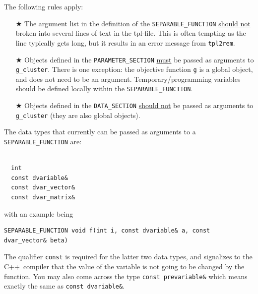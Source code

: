 \documentclass[12pt,letter,reqno]{book}
\begin{document}
The following rules apply:
\begin{itemize}
\item[$\bigstar$] The argument list in the definition of the \texttt{SEPARABLE\_FUNCTION} \underline{should not} broken
	          into several lines of text in the tpl-file. This is often tempting as the line typically gets long,
  		  but it results in an error message from \texttt{tpl2rem}.
\item[$\bigstar$] Objects defined in the \texttt{PARAMETER\_SECTION} \underline{must} be 
		  passed as arguments to \texttt{g\_cluster}. There is one exception: 
		  the objective function \texttt{g} is a global object, and does not need to be an argument.
                  Temporary/programming variables should be defined locally within the \texttt{SEPARABLE\_FUNCTION}.
\item[$\bigstar$] Objects defined in the \texttt{DATA\_SECTION} \underline{should not} be passed as arguments
		  to \texttt{g\_cluster} (they are also global objects).
\end{itemize}
The data types that currently can be passed as arguments to a \texttt{SEPARABLE\_FUNCTION} are:
\begin{lstlisting}

  int
  const dvariable&
  const dvar_vector&
  const dvar_matrix&

\end{lstlisting}
with an example being
\begin{lstlisting}
SEPARABLE_FUNCTION void f(int i, const dvariable& a, const dvar_vector& beta)
\end{lstlisting}
The qualifier \texttt{const} is required for the latter two data types, and signalizes to the 
C++~compiler that the value of the variable is not going to be changed by the function.
You may also come across the type \texttt{const prevariable\&} which means exactly the same as 
\texttt{const dvariable\&}.
\end{document}
